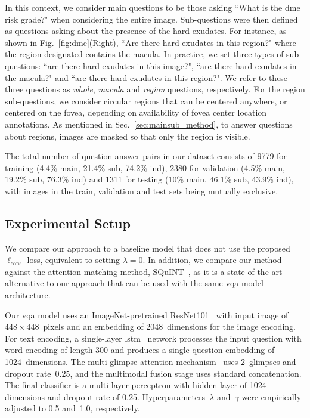 In this context, we consider main questions to be those asking ``What is the \gls{dme} risk grade?" when considering the entire image. Sub-questions were then defined as questions asking about the presence of the hard exudates. For instance, as shown in Fig.~\ref{fig:dme}{(Right)}, ``Are there hard exudates in this region?" where the region designated contains the macula. In practice, we set three types of sub-questions: ``are there hard exudates in this image?", ``are there hard exudates in the macula?" and ``are there hard exudates in this region?". We refer to these three questions as \textit{whole}, \textit{macula} and \textit{region} questions, respectively. For the region sub-questions, we consider circular regions that can be centered anywhere, or centered on the fovea, depending on availability of fovea center location annotations. As mentioned in Sec.~\ref{sec:mainsub_method}, to answer questions about regions, images are masked so that only the region is visible.

The total number of question-answer pairs in our dataset consists of 9779 for training {(4.4\% main, 21.4\% sub, 74.2\% ind)}, 2380 for validation {(4.5\% main, 19.2\% sub, 76.3\% ind)} and 1311 for testing {(10\% main, 46.1\% sub, 43.9\% ind)}, with images in the train, validation and test sets being mutually exclusive.

\subsection{Experimental Setup}

We compare our approach to a baseline model that does not use the proposed $\ell_{\textrm{cons}}$ loss, equivalent to setting $\lambda=0$. In addition, we compare our method against the attention-matching method, SQuINT~\cite{selvaraju2020squinting}, as it is a state-of-the-art alternative to our approach that can be used with the same \gls{vqa} model architecture.

Our \gls{vqa} model uses an ImageNet-pretrained ResNet101~\cite{he2016deep} with input image of $448\times 448$~pixels and an embedding of 2048~dimensions for the image encoding. For text encoding, a single-layer \gls{lstm}~\cite{hochreiter1997long} network processes the input question with word encoding of length 300 and produces a single question embedding of 1024~dimensions. The multi-glimpse attention mechanism~\cite{xu2015show} uses 2~glimpses and dropout rate~$0.25$, and the multimodal fusion stage uses standard concatenation. The final classifier is a multi-layer perceptron with hidden layer of 1024 dimensions and dropout rate of 0.25. Hyperparameters~$\lambda$ and~$\gamma$ were empirically adjusted to 0.5 and~1.0, respectively. 


